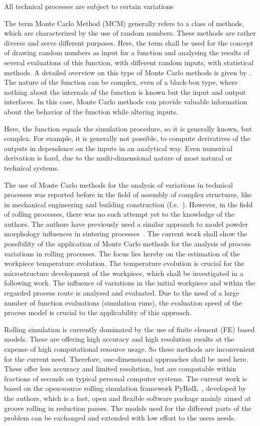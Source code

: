 All technical processes are subject to certain variations


The term Monte Carlo Method (MCM) generally refers to a class of methods, which are characterized by the use of random numbers.
These methods are rather diverse and serve different purposes.
Here, the term shall be used for the concept of drawing random numbers as input for a function and analysing the results of several evaluations of this function, with different random inputs, with statistical methods.
A detailed overview on this type of Monte Carlo methods is given by \textcite{Lemieux2009}.
The nature of the function can be complex, even of a black-box type, where nothing about the internals of the function is known but the input and output interfaces.
In this case, Monte Carlo methods can provide valuable information about the behavior of the function while altering inputs.

Here, the function equals the simulation procedure, so it is generally known, but complex.
For example, it is generally not possible, to compute derivatives of the outputs in dependence on the inputs in an analytical way.
Even numerical derivation is hard, due to the multi-dimensional nature of most natural or technical systems.

The use of Monte Carlo methods for the analysis of variations in technical processes was reported before in the field of assembly of complex structures, like in mechanical engineering and building construction (f.e.~\cite{Lin1997, Shen2005, Dantan2009, Qureshi2012, Yan2015, Rausch2019}).
However, in the field of rolling processes, there was no such attempt yet to the knowledge of the authors.
The authors have previously used a similar approach to model powder morphology influences in sintering processes~\cite{Weiner2022, Weiner2022b}.
The current work shall show the possibility of the application of Monte Carlo methods for the analysis of process variations in rolling processes.
The focus lies hereby on the estimation of the workpiece temperature evolution.
The temperature evolution is crucial for the microstructure development of the workpiece, which shall be investigated in a following work.
The influence of variations in the initial workpiece and within the regarded process route is analysed and evaluated.
Due to the need of a large number of function evaluations (simulation runs), the evaluation speed of the process model is crucial to the applicability of this approach.

Rolling simulation is currently dominated by the use of finite element (FE) based models.
These are offering high accuracy and high resolution results at the expense of high computational resource usage.
So these methods are inconvenient for the current need.
Therefore, one-dimensional approaches shall be used here.
These offer less accuracy and limited resolution, but are computable within fractions of seconds on typical personal computer systems.
The current work is based on the open-source rolling simulation framework PyRolL~\cite{pyroll}, developed by the authors, which is a fast, open and flexible software package mainly aimed at groove rolling in reduction passes.
The models used for the different parts of the problem can be exchanged and extended with low effort to the users needs.

